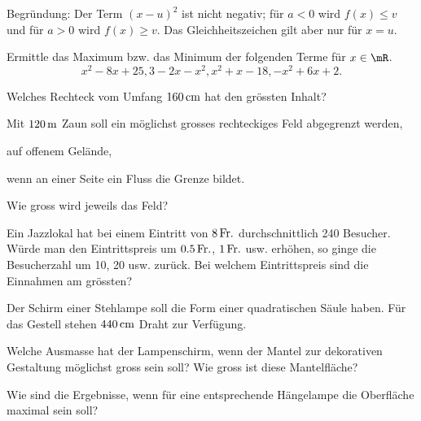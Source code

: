 \documentclass[%
11pt,%
twoside,%
titlepage,%
german,%
headsepline%
]{scrartcl}
\begin{document}
Begr\"undung: Der Term $(x - u)^2$ ist nicht negativ; f\"ur $a <0$ wird $f(x)\leq v$ und f\"ur $a > 0$ wird $f(x) \geq v$. Das Gleichheitszeichen gilt aber nur f\"ur $x =u$.

\begin{ueb}[Extremwerte]
Ermittle das Maximum bzw. das Minimum der folgenden Terme f\"ur $x\in\mR$.
$$x^2 -8x + 25, 3 - 2x - x^2, x^2 + x -18, - x^2 + 6x + 2.$$
\end{ueb}

\begin{ueb}[Maximize]
Welches Rechteck vom Umfang $\unit[160]{cm}$ hat den gr\"ossten Inhalt?
\end{ueb}

\begin{ueb}
Mit $\unit[120]{m}$ Zaun soll ein m\"oglichst grosses rechteckiges Feld abgegrenzt werden,
\begin{enumeratea}
\item auf offenem Gel\"ande,
\item wenn an einer Seite ein Fluss die Grenze bildet.
\end{enumeratea}
Wie gross wird jeweils das Feld?
\end{ueb}

\begin{ueb}
Ein Jazzlokal hat bei einem Eintritt von $\unit[8]{Fr.}$ durchschnittlich 240 Besucher. W\"urde man den Eintrittspreis um $\unit[0.5]{Fr.}$, $\unit[1]{Fr.}$ usw. erh\"ohen, so ginge die Besucherzahl um 10, 20 usw. zur\"uck. Bei welchem Eintrittspreis sind die Einnahmen am gr\"ossten?
\end{ueb}


\begin{ueb}[Lampe]
Der Schirm einer Stehlampe soll die Form einer quadratischen S\"aule haben. F\"ur das Gestell stehen $\unit[440]{cm}$ Draht zur Verf\"ugung.
\begin{enumeratea}
\item Welche Ausmasse hat der Lampenschirm, wenn
der Mantel zur dekorativen Gestaltung m\"oglichst
gross sein soll? Wie gross ist diese Mantelfl\"ache?
\item Wie sind die Ergebnisse, wenn f\"ur eine entsprechende H\"angelampe die Oberfl\"ache maximal sein
soll?
\end{enumeratea}
\end{ueb}
\end{document}
